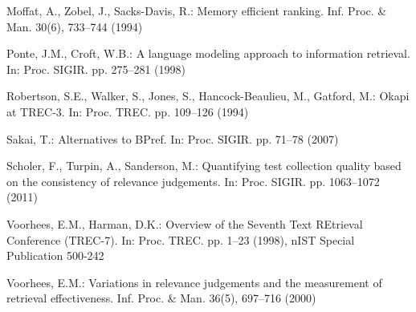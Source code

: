 \documentclass[runningheads,a4paper]{llncs}
\begin{document}
\begin{small}
\begin{thebibliography}{14}
Moffat, A., Zobel, J., Sacks-{D}avis, R.: Memory efficient ranking.
\newblock Inf. Proc. \& Man. 30(6), 733--744 (1994)

Ponte, J.M., Croft, W.B.: A language modeling approach to information
  retrieval.
\newblock In: Proc. SIGIR. pp. 275--281 (1998)

Robertson, S.E., Walker, S., Jones, S., Hancock-{B}eaulieu, M., Gatford, M.:
  Okapi at {TREC}-3.
\newblock In: Proc. TREC. pp. 109--126 (1994)

Sakai, T.: Alternatives to {BP}ref.
\newblock In: Proc. SIGIR. pp. 71--78 (2007)

Scholer, F., Turpin, A., Sanderson, M.: Quantifying test collection quality
  based on the consistency of relevance judgements.
\newblock In: Proc. SIGIR. pp. 1063--1072 (2011)

Voorhees, E.M., Harman, D.K.: Overview of the {S}eventh {T}ext {RE}trieval
  {C}onference ({TREC}-7).
\newblock In: Proc. TREC. pp. 1--23 (1998), nIST Special Publication 500-242

Voorhees, E.M.: Variations in relevance judgements and the measurement of
  retrieval effectiveness.
\newblock Inf. Proc. \& Man. 36(5), 697--716 (2000)

\end{thebibliography}
 
\end{small}
\end{document}
